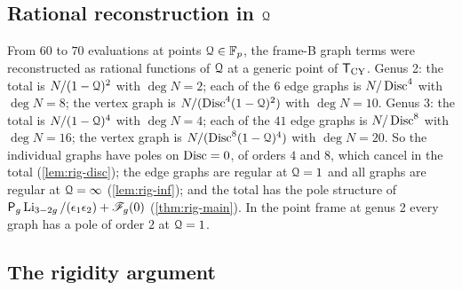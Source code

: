\subsection{Rational reconstruction in \texorpdfstring{$\mathcal{Q}$}{Q}}
\label{sec:evi-rational}

From $60$ to $70$ evaluations at points $\mathcal{Q}\in\mathbb{F}_p$, the frame-B graph terms were reconstructed as rational functions of $\mathcal{Q}$ at a generic point of $\mathsf{T}_{\mathrm{CY}}$. Genus 2: the total is $N/(1-\mathcal{Q})^2$ with $\deg N=2$; each of the $6$ edge graphs is $N/\operatorname{Disc}^4$ with $\deg N=8$; the vertex graph is $N/(\operatorname{Disc}^4(1-\mathcal{Q})^2)$ with $\deg N=10$. Genus 3: the total is $N/(1-\mathcal{Q})^4$ with $\deg N=4$; each of the $41$ edge graphs is $N/\operatorname{Disc}^8$ with $\deg N=16$; the vertex graph is $N/(\operatorname{Disc}^8(1-\mathcal{Q})^4)$ with $\deg N=20$. So the individual graphs have poles on $\operatorname{Disc}=0$, of orders $4$ and $8$, which cancel in the total (\cref{lem:rig-disc}); the edge graphs are regular at $\mathcal{Q}=1$ and all graphs are regular at $\mathcal{Q}=\infty$ (\cref{lem:rig-inf}); and the total has the pole structure of $\mathsf{P}_{g}\operatorname{Li}_{3-2g}/(\epsilon_1\epsilon_2)+\mathscr{F}_g(0)$ (\cref{thm:rig-main}). In the point frame at genus 2 every graph has a pole of order $2$ at $\mathcal{Q}=1$.

\subsection{The rigidity argument}
\label{sec:evi-rig}

